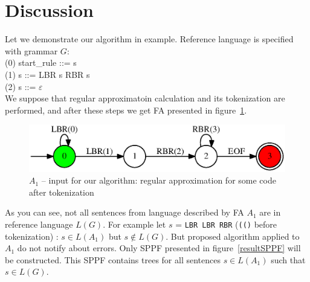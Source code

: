 \section{Discussion}

Let we demonstrate our algorithm in example. Reference language is specified with grammar $G$:\\
(0) start\_rule ::= s \\
(1) s ::= LBR s RBR s\\
(2) s ::= $\varepsilon$ \\

We suppose that regular approximatoin calculation and its tokenization are performed, and after these steps we get FA presented in figure~\ref{faApprox}. 


\begin{figure}
    \begin{center}
        \includegraphics[scale=0.5]{dot/in3.eps}
    \end{center}
    \caption{$A_1$ -- input for our algorithm: regular approximation for some code after tokenization} 
    \label{faApprox}
\end{figure}

As you can see, not all sentences from language described by FA $A_1$ are in reference language $L(G)$.
For example let $s$ = \verb|LBR LBR RBR| (\verb|(()| before tokenization) : $s \in L(A_1)$ but $s \notin L(G)$.
But proposed algorithm applied to $A_1$ do not notify about errors. Only SPPF presented in figure~\ref{resultSPPF} will be constructed.
This SPPF contains trees for all sentences $s \in L(A_1)$ such that $s \in L(G)$.

